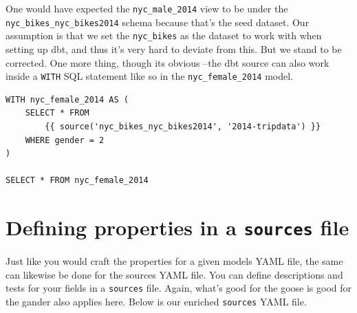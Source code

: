 \documentclass[
]{book}
\begin{document}
One would have expected the \texttt{nyc\_male\_2014} view to be under the \texttt{nyc\_bikes\_nyc\_bikes2014} schema because that's the seed dataset. Our assumption is that we set the \texttt{nyc\_bikes} as the dataset to work with when setting up dbt, and thus it's very hard to deviate from this. But we stand to be corrected. One more thing, though its obvious --the dbt source can also work inside a \texttt{WITH} SQL statement like so in the \texttt{nyc\_female\_2014} model.

\begin{verbatim}
WITH nyc_female_2014 AS (
    SELECT * FROM 
        {{ source('nyc_bikes_nyc_bikes2014', '2014-tripdata') }}
    WHERE gender = 2
)

SELECT * FROM nyc_female_2014
\end{verbatim}

\hypertarget{defining-properties-in-a-sources-file}{%
\section{\texorpdfstring{Defining properties in a \texttt{sources} file}{Defining properties in a sources file}}\label{defining-properties-in-a-sources-file}}

Just like you would craft the properties for a given models YAML file, the same can likewise be done for the sources YAML file. You can define descriptions and tests for your fields in a \texttt{sources} file. Again, what's good for the goose is good for the gander also applies here. Below is our enriched \texttt{sources} YAML file.
\end{document}
